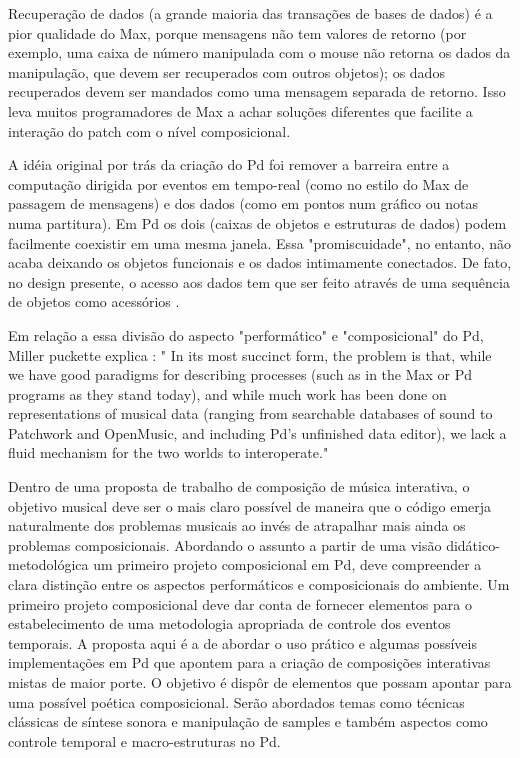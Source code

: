 \documentclass[12pt]{article}
\begin{document}
Recuperação de dados (a grande maioria das transações de bases de
dados) é a pior qualidade do Max, porque mensagens não tem valores de
retorno (por exemplo, uma caixa de número manipulada com o mouse
não retorna os dados da manipulação, que devem ser recuperados com outros
objetos); os dados recuperados devem ser mandados como uma mensagem 
separada de retorno. Isso leva muitos programadores de Max a achar soluções
diferentes que facilite a interação do patch com o nível composicional.

A idéia original por trás da criação do Pd foi remover a barreira
entre a computação dirigida por eventos em tempo-real (como no estilo
do Max de passagem de mensagens) e dos dados (como em pontos num
gráfico ou notas numa partitura). Em Pd os dois (caixas de objetos e
estruturas de dados) podem facilmente coexistir em uma mesma janela.
Essa "promiscuidade", no entanto, não acaba deixando os objetos
funcionais e os dados intimamente conectados. De fato, no design
presente, o acesso aos dados tem que ser feito através de uma
sequência de objetos como acessórios . 

Em relação a essa divisão do aspecto "performático" e "composicional" do Pd,
Miller puckette explica \cite{puckette04:divide} : " In its most succinct form, 
the problem is that, while we have good
paradigms for describing processes (such as in the Max or Pd programs
as they stand today), and while much work has been done on
representations of musical data (ranging from searchable databases of
sound to Patchwork and OpenMusic, and including Pd's unfinished data
editor), we lack a fluid mechanism for the two worlds to
interoperate."

Dentro de uma proposta de trabalho de composição de música interativa,
o objetivo musical deve ser o mais claro possível de maneira que o
código emerja naturalmente dos problemas musicais ao invés de
atrapalhar mais ainda os problemas composicionais. Abordando o assunto
a partir de uma visão didático-metodológica um primeiro projeto
composicional em Pd, deve compreender a clara distinção entre os
aspectos performáticos e composicionais do ambiente. Um primeiro
projeto composicional deve dar conta de fornecer elementos para o
estabelecimento de uma metodologia apropriada de controle dos eventos
temporais. A proposta aqui é a de abordar o uso prático e algumas
possíveis implementações em Pd que apontem para a criação de
composições interativas mistas de maior porte. O objetivo é dispôr de
elementos que possam apontar para uma possível poética composicional.
Serão abordados temas como técnicas clássicas de síntese sonora e
manipulação de samples e também aspectos como controle temporal e
macro-estruturas no Pd.
\end{document}
